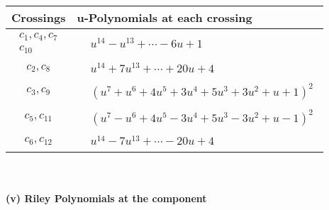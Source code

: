 \documentclass[1p]{elsarticle_modified}
\theoremstyle{definition}
\begin{document}
\begin{tabular}{m{50pt}|m{274pt}}
Crossings & \hspace{64pt}u-Polynomials at each crossing \\
\hline $$\begin{aligned}c_{1},c_{4},c_{7}\\c_{10}\end{aligned}$$&$\begin{aligned}
&u^{14}- u^{13}+\cdots-6 u+1
\end{aligned}$\\
\hline $$\begin{aligned}c_{2},c_{8}\end{aligned}$$&$\begin{aligned}
&u^{14}+7 u^{13}+\cdots+20 u+4
\end{aligned}$\\
\hline $$\begin{aligned}c_{3},c_{9}\end{aligned}$$&$\begin{aligned}
&(u^7+u^6+4 u^5+3 u^4+5 u^3+3 u^2+u+1)^2
\end{aligned}$\\
\hline $$\begin{aligned}c_{5},c_{11}\end{aligned}$$&$\begin{aligned}
&(u^7- u^6+4 u^5-3 u^4+5 u^3-3 u^2+u-1)^2
\end{aligned}$\\
\hline $$\begin{aligned}c_{6},c_{12}\end{aligned}$$&$\begin{aligned}
&u^{14}-7 u^{13}+\cdots-20 u+4
\end{aligned}$\\
\hline
\end{tabular}\\~\\
\newpage\renewcommand{\arraystretch}{1}
\flushleft \textbf{(v) Riley Polynomials at the component}\newline \\
\end{document}
